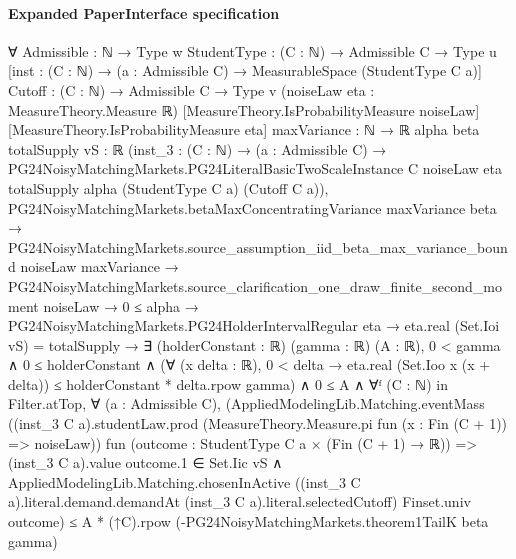 \documentclass[10pt]{article}
\begin{document}
\paragraph{Expanded PaperInterface specification}
\begin{ReviewVerbatim}
∀ {Admissible : ℕ → Type w} {StudentType : (C : ℕ) → Admissible C → Type u}
  [inst : (C : ℕ) → (a : Admissible C) → MeasurableSpace (StudentType C a)] {Cutoff : (C : ℕ) → Admissible C → Type v}
  (noiseLaw eta : MeasureTheory.Measure ℝ) [MeasureTheory.IsProbabilityMeasure noiseLaw]
  [MeasureTheory.IsProbabilityMeasure eta] {maxVariance : ℕ → ℝ} {alpha beta totalSupply vS : ℝ}
  (inst_3 :
    (C : ℕ) →
      (a : Admissible C) →
        PG24NoisyMatchingMarkets.PG24LiteralBasicTwoScaleInstance C noiseLaw eta totalSupply alpha (StudentType C a)
          (Cutoff C a)),
  PG24NoisyMatchingMarkets.betaMaxConcentratingVariance maxVariance beta →
    PG24NoisyMatchingMarkets.source_assumption_iid_beta_max_variance_bound noiseLaw maxVariance →
      PG24NoisyMatchingMarkets.source_clarification_one_draw_finite_second_moment noiseLaw →
        0 ≤ alpha →
          PG24NoisyMatchingMarkets.PG24HolderIntervalRegular eta →
            eta.real (Set.Ioi vS) = totalSupply →
              ∃ (holderConstant : ℝ) (gamma : ℝ) (A : ℝ),
                0 < gamma ∧
                  0 ≤ holderConstant ∧
                    (∀ (x delta : ℝ),
                        0 < delta → eta.real (Set.Ioo x (x + delta)) ≤ holderConstant * delta.rpow gamma) ∧
                      0 ≤ A ∧
                        ∀ᶠ (C : ℕ) in Filter.atTop,
                          ∀ (a : Admissible C),
                            (AppliedModelingLib.Matching.eventMass
                                ((inst_3 C a).studentLaw.prod
                                  (MeasureTheory.Measure.pi fun (x : Fin (C + 1)) => noiseLaw))
                                fun (outcome : StudentType C a × (Fin (C + 1) → ℝ)) =>
                                (inst_3 C a).value outcome.1 ∈ Set.Iic vS ∧
                                  AppliedModelingLib.Matching.chosenInActive
                                    ((inst_3 C a).literal.demand.demandAt (inst_3 C a).literal.selectedCutoff)
                                    Finset.univ outcome) ≤
                              A * (↑C).rpow (-PG24NoisyMatchingMarkets.theorem1TailK beta gamma)
\end{ReviewVerbatim}
\end{document}
